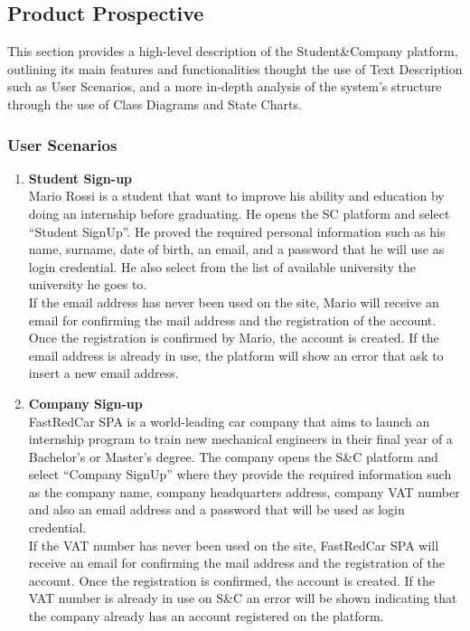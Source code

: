 \subsection{Product Prospective}
This section provides a high-level description of the Student\&Company platform, outlining its main features and functionalities thought the use of Text Description such as User Scenarios, and a more in-depth analysis of the system's structure through the use of Class Diagrams and State Charts.
\subsubsection{User Scenarios}

\begin{enumerate}
        \item \textbf{\textcolor{titleColor}{Student Sign-up}}\\
        Mario Rossi is a student that want to improve his ability and education by doing an internship before graduating. He opens the SC platform and select “Student SignUp”. He proved the required personal information such as his name, surname, date of birth, an email, and a password that he will use as login credential. He also select from the list of available university the university he goes to.\\
        If the email address has never been used on the site, Mario will receive an email for confirming the mail address and the registration of the account. Once the registration is confirmed by Mario, the account is created. If the email address is already in use, the platform will show an error that ask to insert a new email address.
    \item \textbf{\textcolor{titleColor}{Company Sign-up}}\\
        FastRedCar SPA is a world-leading car company that aims to launch an internship program to train new mechanical engineers in their final year of a Bachelor’s or Master’s degree. The company opens the S\&C platform and select “Company SignUp” where they provide the required information such as the company name, company headquarters address, company VAT number and also an email address and a password that will be used as login credential.\\
        If the VAT number has never been used on the site, FastRedCar SPA will receive an email for confirming the mail address and the registration of the account. Once the registration is confirmed, the account is created.
        If the VAT number is already in use on S\&C an error will be shown indicating that the company already has an account registered on the platform.

\end{enumerate}
